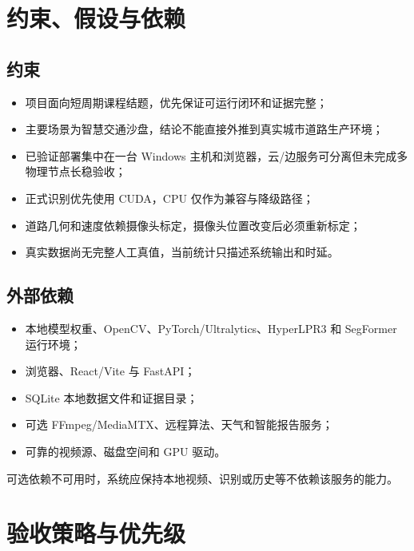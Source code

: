 \section{约束、假设与依赖}\label{requirements-ux7ea6ux675fux5047ux8bbeux4e0eux4f9dux8d56}

\subsection{约束}\label{requirements-ux7ea6ux675f}

\begin{itemize}
\tightlist
\item
  项目面向短周期课程结题，优先保证可运行闭环和证据完整；
\item
  主要场景为智慧交通沙盘，结论不能直接外推到真实城市道路生产环境；
\item
  已验证部署集中在一台 Windows 主机和浏览器，云/边服务可分离但未完成多物理节点长稳验收；
\item
  正式识别优先使用 CUDA，CPU 仅作为兼容与降级路径；
\item
  道路几何和速度依赖摄像头标定，摄像头位置改变后必须重新标定；
\item
  真实数据尚无完整人工真值，当前统计只描述系统输出和时延。
\end{itemize}

\subsection{外部依赖}\label{requirements-ux5916ux90e8ux4f9dux8d56}

\begin{itemize}
\tightlist
\item
  本地模型权重、OpenCV、PyTorch/Ultralytics、HyperLPR3 和 SegFormer 运行环境；
\item
  浏览器、React/Vite 与 FastAPI；
\item
  SQLite 本地数据文件和证据目录；
\item
  可选 FFmpeg/MediaMTX、远程算法、天气和智能报告服务；
\item
  可靠的视频源、磁盘空间和 GPU 驱动。
\end{itemize}

可选依赖不可用时，系统应保持本地视频、识别或历史等不依赖该服务的能力。

\section{验收策略与优先级}\label{requirements-ux9a8cux6536ux7b56ux7565ux4e0eux4f18ux5148ux7ea7}

